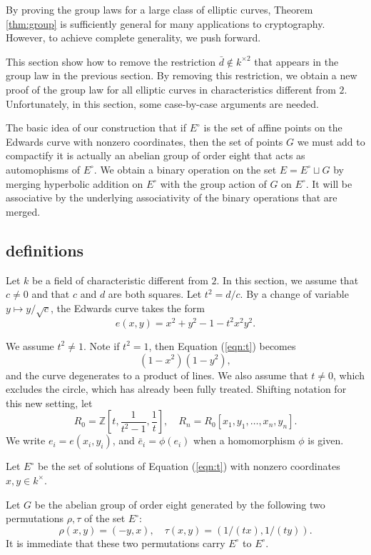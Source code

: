 \documentclass[12pt]{article}
\newcommand{\ring}[1]{\mathbb{#1}}
\newcommand{\Eoo}{E^{\circ}}
\begin{document}
By proving the group laws for a large class of elliptic curves,
Theorem \ref{thm:group} is sufficiently general for many applications
to cryptography.  However, to achieve complete generality, we
push forward.

This section show how to remove the restriction $\bar d\not\in
k^{\times 2}$ that appears in the group law in the previous section.
By removing this restriction, we obtain a new proof of the group law
for all elliptic curves in characteristics different from $2$.
Unfortunately, in this section, some case-by-case arguments are
needed.

The basic idea of our construction that if $\Eoo$ is the set of affine
points on the Edwards curve with nonzero coordinates, then the set of
points $G$ we must add to compactify it is actually an abelian group of order
eight that acts as automophisms of $\Eoo$.  We obtain a binary
operation on the set $E=\Eoo\sqcup G$ by merging
hyperbolic addition on $\Eoo$ with the group action of $G$ on $\Eoo$.
It will be associative by the underlying associativity of the binary
operations that are merged.

\subsection{definitions}

Let $k$ be a field of characteristic different from $2$.  In this
section, we assume that $c\ne 0$ and that $c$ and $d$ are both
squares.  Let $t^2 = d/c$.  By a change of variable $y\mapsto
y/\sqrt{c}$, the Edwards curve takes the form
\begin{equation}\label{eqn:t}
e(x,y)= x^2 + y^2 -1 - t^2 x^2 y^2.
\end{equation}

We assume $t^2\ne 1$.  Note if $t^2=1$, then Equation (\ref{eqn:t})
becomes
\[
(1-x^2)(1-y^2),
\]
and the curve degenerates to a product of lines.  We also assume that
$t\ne 0$, which excludes the circle, which has already been fully
treated.  Shifting notation for this new setting, let
\[
R_0 = \ring{Z}[t,\frac{1}{t^2-1},\frac1t],\quad
R_n = R_0[x_1,y_1,\ldots,x_n,y_n].
\]
We write $e_i = e(x_i,y_i)$, and $\bar e_i = \phi(e_i)$ when a
homomorphism $\phi$ is given.

Let $\Eoo$ be the set of solutions of Equation (\ref{eqn:t}) with
nonzero coordinates $x,y\in k^\times$.

Let $G$ be the abelian group of order eight generated by the following
two permutations $\rho,\tau$ of the set $\Eoo$:
\[
\rho(x,y) = (-y,x),\quad \tau(x,y) = (1/(tx),1/(ty)).
\]
It is immediate that these two permutations carry $\Eoo$ to $\Eoo$.
\end{document}

